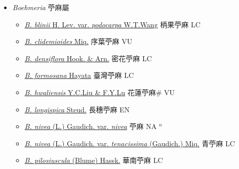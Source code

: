 
  \begin{itemize}
 \item[] \textit{Boehmeria} 苧麻屬
                    
  \begin{itemize}
        \item[] \href{http://www.theplantlist.org/tpl1.1/search?q=Boehmeria+blinii+var.+podocarpa}{\textit{B. blinii} H. Lev. var. \textit{podocarpa} W.T.Wang}   柄果苧麻 LC
        \item[] \href{http://www.theplantlist.org/tpl1.1/search?q=Boehmeria+clidemioides}{\textit{B. clidemioides} Miq.}   序葉苧麻 VU
        \item[] \href{http://www.theplantlist.org/tpl1.1/search?q=Boehmeria+densiflora}{\textit{B. densiflora} Hook. \& Arn.}   密花苧麻 LC
        \item[] \href{http://www.theplantlist.org/tpl1.1/search?q=Boehmeria+formosana}{\textit{B. formosana} Hayata}   臺灣苧麻 LC
        \item[] \href{http://www.theplantlist.org/tpl1.1/search?q=Boehmeria+hwaliensis}{\textit{B. hwaliensis} Y.C.Liu \& F.Y.Lu}   花蓮苧麻\# VU
        \item[] \href{http://www.theplantlist.org/tpl1.1/search?q=Boehmeria+longispica}{\textit{B. longispica} Steud.}   長穗苧麻 EN
        \item[] \href{http://www.theplantlist.org/tpl1.1/search?q=Boehmeria+nivea+var.+nivea}{\textit{B. nivea} (L.) Gaudich. var. \textit{nivea}}   苧麻 NA $^n$
        \item[] \href{http://www.theplantlist.org/tpl1.1/search?q=Boehmeria+nivea+var.+tenacissima}{\textit{B. nivea} (L.) Gaudich. var. \textit{tenacissima} (Gaudich.) Miq.}   青苧麻 LC
        \item[] \href{http://www.theplantlist.org/tpl1.1/search?q=Boehmeria+pilosiuscula}{\textit{B. pilosiuscula} (Blume) Hassk.}   華南苧麻 LC

\end{itemize}
\end{itemize}
